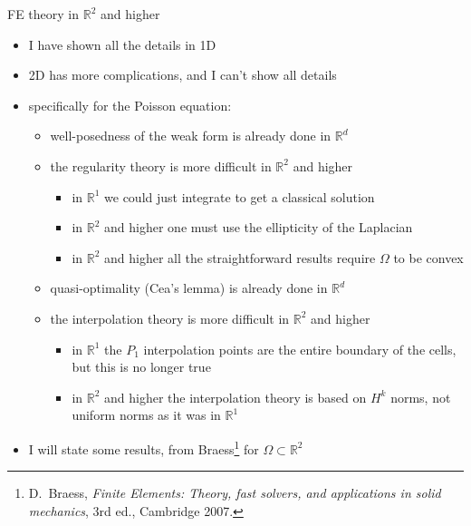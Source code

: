 \documentclass[10pt,
               svgnames,
               hyperref={colorlinks,
                         citecolor=DeepPink4,
                         linkcolor=FireBrick,
                         urlcolor=blue},
               usepdftitle=false]{beamer}
\newcommand{\RR}{\mathbb{R}}
\begin{document}
\begin{frame}{FE theory in $\RR^2$ and higher}

\begin{itemize}
\item I have shown all the details in 1D
\item \alert{2D has more complications}, and I can't show all details
\item specifically for the Poisson equation:
    \begin{itemize}
    \item[$\circ$] well-posedness of the weak form is already done in $\RR^d$
    \item[$\circ$] \alert{the regularity theory is more difficult} in $\RR^2$ and higher
        \begin{itemize}
        \item in $\RR^1$ we could just integrate to get a classical solution
        \item in $\RR^2$ and higher one must use the \alert{ellipticity} of the Laplacian
        \item in $\RR^2$ and higher all the straightforward results require $\Omega$ to be convex
        \end{itemize}
    \item[$\circ$] quasi-optimality (Cea's lemma) is already done in $\RR^d$
    \item[$\circ$] \alert{the interpolation theory is more difficult} in $\RR^2$ and higher
        \begin{itemize}
        \item in $\RR^1$ the $P_1$ interpolation points are the entire boundary of the cells, but this is no longer true
        \item in $\RR^2$ and higher the interpolation theory is based on $H^k$ norms, not uniform norms as it was in $\RR^1$
        \end{itemize}
    \end{itemize}
\item I will state some results, from Braess\footnote{D.~Braess, \emph{Finite Elements: Theory, fast solvers, and applications in solid mechanics}, 3rd ed., Cambridge 2007.} for $\Omega\subset \RR^2$
\end{itemize}
\end{frame}
\end{document}
